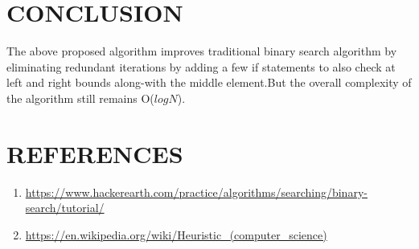 \documentclass[conference]{IEEEtran}
\begin{document}
\section{CONCLUSION}
The above proposed algorithm improves traditional binary search algorithm by eliminating redundant iterations by adding a few if statements to also check at left and right bounds along-with the middle element.But the overall complexity of the algorithm still remains O($logN$).

\section{REFERENCES}
\begin{enumerate}
    \item \url{https://www.hackerearth.com/practice/algorithms/searching/binary-search/tutorial/}
    \item \url{https://en.wikipedia.org/wiki/Heuristic_(computer_science)}
\end{enumerate}
\end{document}
